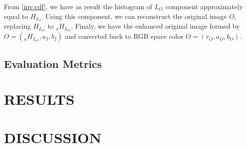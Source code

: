 \documentclass{article}
\begin{document}
    From \ref{inv:cdf}, we have as result the histogram of $L_O$ component approximately equal to $H_{L_I}$. Using this component, we can reconstruct the original image $O$, replacing $H_{L_O}$ to $_aH_{L_O}$. Finaly, we have the enhanced original image formed by $O = (_aH_{L_O}, a_I, b_I)$ and converted back to RGB space color $O = (r_O, a_O, b_O)$.
    
    \subsection{Evaluation Metrics}
    
    
    
    
    
    
    
    
    
    
    
    
    
    
    
    
    \section{RESULTS}
    \label{sec:pagestyle}
    
    
    \section{DISCUSSION}
    \label{sec:typestyle}
    
    
    
    
    
    
\end{document}
